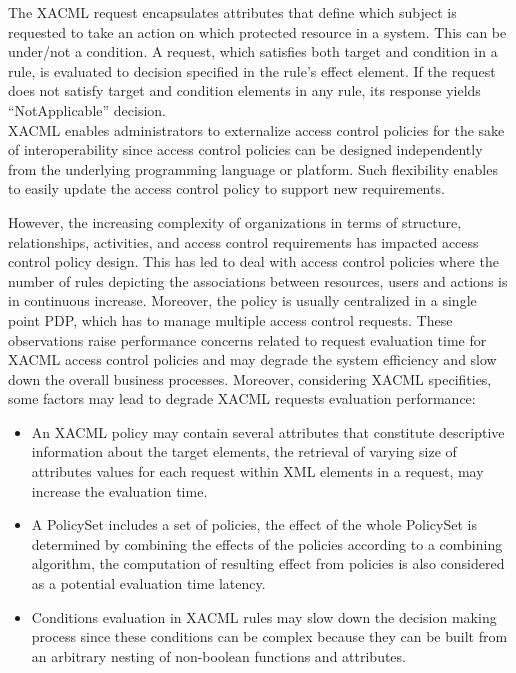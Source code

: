 The XACML request encapsulates attributes that define which subject is requested to take an action on which protected resource in a system.
This can be under/not a condition. A request, which satisfies both target and condition in a rule, is evaluated
to decision specified in the rule's effect element. If the request does not satisfy target and condition elements in any rule, its response yields ``NotApplicable'' decision.
\\XACML enables administrators to externalize access control policies for the sake of interoperability since access control policies can be designed 
independently from the underlying programming language or platform. Such flexibility enables to easily update the access control policy to support new requirements.

However, the increasing complexity of organizations in terms of structure, relationships, activities, and access control requirements has impacted 
access control policy design. This has led to deal with access control policies where the number of rules depicting the associations between resources, 
users and actions is in continuous increase. Moreover, the policy is usually centralized in a single point PDP, which has to manage 
multiple access control requests. These observations raise performance concerns related to request evaluation time for XACML access control policies and may 
degrade the system efficiency and slow down the overall business processes. 
Moreover, considering XACML specifities, some factors may lead to degrade XACML requests evaluation performance: 

\begin{itemize}
\item An XACML policy may contain several attributes that constitute descriptive information about the target elements, the retrieval of
 varying size of attributes values for each request within XML elements in a request, may increase the evaluation time.
\item A PolicySet includes a set of policies, the effect of the whole PolicySet is determined by combining the effects of 
the policies according to a combining algorithm, the computation of resulting effect from policies is also considered as a potential evaluation
 time latency.
\item Conditions evaluation in XACML rules may slow down the decision making process since these conditions can be complex because they can 
be built from an arbitrary nesting of non-boolean functions and attributes. 
\end{itemize}

